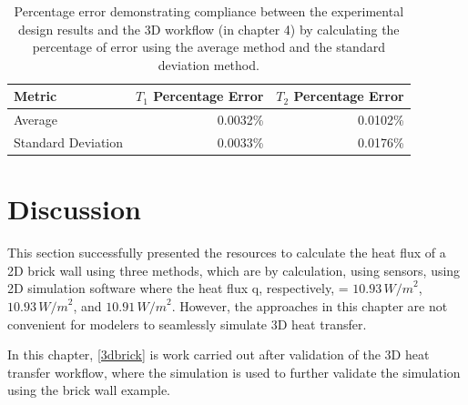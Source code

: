 \begin{table}[tb]
\caption[2D Results Percentage error]{Percentage error demonstrating compliance between the experimental design results and the 3D workflow (in chapter 4) by calculating the percentage of error using the average method and the standard deviation method.}
    \label{error2d}
     \centering
 \begin{tabular}{lrr}
        \toprule
        Metric & $T_1$ Percentage Error & $T_2$ Percentage Error \\
        \midrule
        Average & 0.0032\% & 0.0102\% \\
        Standard Deviation & 0.0033\% & 0.0176\% \\
        \bottomrule
    \end{tabular}
\end{table}






\section{Discussion}
This section successfully presented the resources to calculate the heat flux of a 2D brick wall using three methods, which are by calculation, using sensors, using 2D simulation software where the heat flux q, respectively, = \( 10.93 \, {W/m}^2 \), \( 10.93 \, {W/m}^2 \), and \( 10.91 \, {W/m}^2 \). However, the approaches in this chapter are not convenient for modelers to seamlessly simulate 3D heat transfer. 

In this chapter, \ref{3dbrick} is work carried out after validation of the 3D heat transfer workflow, where the simulation is used to further validate the simulation using the brick wall example.


